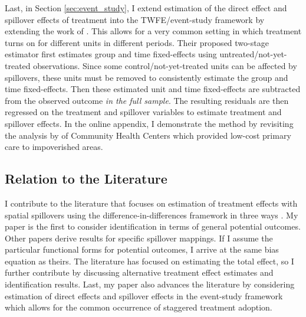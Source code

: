 \documentclass[11pt]{article}
\begin{document}
Last, in Section \ref{sec:event_study}, I extend estimation of the direct effect and spillover effects of treatment into the TWFE/event-study framework by extending the work of \citet{Gardner_2021}. This allows for a very common setting in which treatment turns on for different units in different periods. Their proposed two-stage estimator first estimates group and time fixed-effects using untreated/not-yet-treated observations. Since some control/not-yet-treated units can be affected by spillovers, these units must be removed to consistently estimate the group and time fixed-effects. Then these estimated unit and time fixed-effects are subtracted from the observed outcome \emph{in the full sample}. The resulting residuals are then regressed on the treatment and spillover variables to estimate treatment and spillover effects. In the online appendix, I demonstrate the method by revisiting the analysis by \citet{Bailey_Goodman_Bacon_2015} of Community Health Centers which provided low-cost primary care to impoverished areas.

\subsection{Relation to the Literature} 

I contribute to the literature that focuses on estimation of treatment effects with spatial spillovers using the difference-in-differences framework in three ways \citep{Clarke_2017,Berg_Streitz_2019,Verbitsky-Savitz_Raudenbush_2012,Delgado_Florax_2015}. My paper is the first to consider identification in terms of general potential outcomes. Other papers derive results for specific spillover mappings. If I assume the particular functional forms for potential outcomes, I arrive at the same bias equation as theirs. The literature has focused on estimating the total effect, so I further contribute by discussing alternative treatment effect estimates and identification results. Last, my paper also advances the literature by considering estimation of direct effects and spillover effects in the event-study framework which allows for the common occurrence of staggered treatment adoption.
\end{document}
